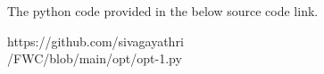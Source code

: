 \documentclass[a4paper,10pt]{report}
\begin{document}
\begin{multicols}{2}
\raggedright\large{The python code provided in the below source code link.} \\
\begin{mdframed}
\raggedright\large{https://github.com/sivagayathri \\ /FWC/blob/main/opt/opt-1.py}
\end{mdframed}
\end{multicols}
\end{document}
